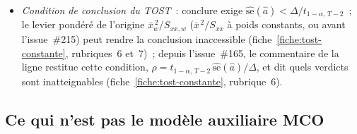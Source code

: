 \documentclass[a4paper,11pt]{article}
\newcommand{\code}[1]{\texttt{\small #1}}
\begin{document}
\begin{itemize}[itemsep=1pt]
  non définie~; sous la règle~R13, les pertes constantes et le garde-fou~R12, le commentaire se
  réduit au motif. Avant l'issue~\#189, ce cas sortait sans motif pour la constante, la pente et
  Fisher, le motif de $R^2$ l'attribuait à tort au garde-fou~R12, et le TOST rendait
  \code{ECHEC}. Mesuré sur les volumes du jeu de contrôle et $y_t = 80$ (méthode prime,
  $B = 99$)~: ces lignes sont désormais non applicables avec ce motif, la table garde toutes ses
  lignes, et seize verdicts \code{ECHEC} apparaissent ailleurs (notamment RESET, les corrélations
  de rang du ratio, Durbin--Watson, Ljung--Box, sup-F et OLS-CUSUM), qui signalent la saisie
  anormale.
  \item \emph{Condition de conclusion du TOST}~: conclure exige
  $\widehat{\mathrm{se}}(\hat a) < \Delta/t_{1-\alpha,\,T-2}$~; le levier pondéré de l'origine
  $\bar x_w^{\,2}/S_{xx,w}$ ($\bar x^{\,2}/S_{xx}$ à poids constants, ou avant l'issue~\#215) peut
  rendre la conclusion inaccessible (fiche~\ref{fiche:tost-constante},
  rubriques~6 et~7)~; depuis l'issue~\#165, le commentaire de la ligne restitue cette condition,
  $\rho = t_{1-\alpha,\,T-2}\,\widehat{\mathrm{se}}(\hat a)/\Delta$, et dit quels verdicts sont
  inatteignables (fiche~\ref{fiche:tost-constante}, rubrique~6).
\end{itemize}

\subsection{Ce qui n'est pas le modèle auxiliaire MCO}
\label{sec:modele-auxiliaire-autres}
\end{document}
